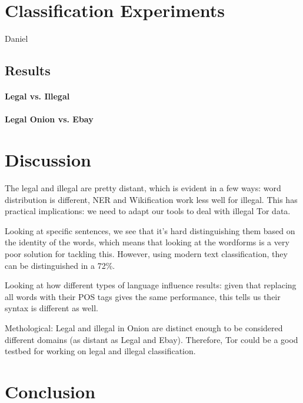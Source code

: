 \documentclass[11pt,a4paper]{article}
\begin{document}
\section{Classification Experiments}

Daniel

\subsection{Results}

\paragraph{Legal vs. Illegal}

\paragraph{Legal Onion vs. Ebay}


\section{Discussion}

The legal and illegal are pretty distant, which is evident in a few ways: word distribution is different, NER and Wikification work less well
for illegal. This has practical implications: we need to adapt our tools to deal with illegal Tor data. 

Looking at specific sentences, we see that it's hard distinguishing them based on the identity of the words, which means that
looking at the wordforms is a very poor solution for tackling this. However, using modern text classification, they can be distinguished
in a 72\%. 

Looking at how different types of language influence results: given that replacing all words with their POS tags gives
the same performance, this tells us their syntax is different as well.

Methological: Legal and illegal in Onion are distinct enough to be considered different domains (as distant as Legal and Ebay). 
Therefore, Tor could be a good testbed for working on legal and illegal classification.


\section{Conclusion}
 














\end{document}
